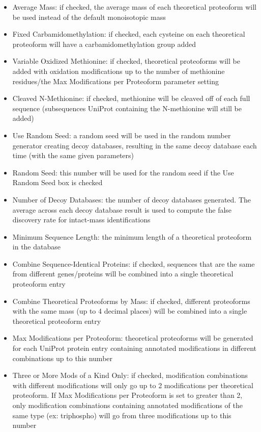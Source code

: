 \begin{itemize}
\item Average Mass: if checked, the average mass of each theoretical proteoform will be used instead of the default monoisotopic mass
\item Fixed Carbamidomethylation: if checked, each cysteine on each theoretical proteoform will have a carbamidomethylation group added
\item Variable Oxidized Methionine: if checked, theoretical proteoforms will be added with oxidation modifications up to the number of methionine residues/the Max Modifications per Proteoform parameter setting
\item Cleaved N-Methionine: if checked, methionine will be cleaved off of each full sequence (subsequences UniProt containing the N-methionine will still be added)
\item Use Random Seed: a random seed will be used in the random number generator creating decoy databases, resulting in the same decoy database each time (with the same given parameters)
\item Random Seed: this number will be used for the random seed if the Use Random Seed box is checked
\item Number of Decoy Databases: the number of decoy databases generated. The average across each decoy database result is used to compute the false discovery rate for intact-mass identifications
\item Minimum Sequence Length: the minimum length of a theoretical proteoform in the database
\item Combine Sequence-Identical Proteins: if checked, sequences that are the same from different genes/proteins will be combined into a single theoretical proteoform entry
\item Combine Theoretical Proteoforms by Mass: if checked, different proteoforms with the same mass (up to 4 decimal places) will be combined into a single theoretical proteoform entry
\item Max Modifications per Proteoform: theoretical proteoforms will be generated for each UniProt protein entry containing annotated modifications in different combinations up to this number
\item Three or More Mods of a Kind Only: if checked, modification combinations with different modifications will only go up to 2 modifications per theoretical proteoform. If Max Modifications per Proteoform is set to greater than 2, only modification combinations containing annotated modifications of the same type (ex: triphospho) will go from three modifications up to this number

\end{itemize}
